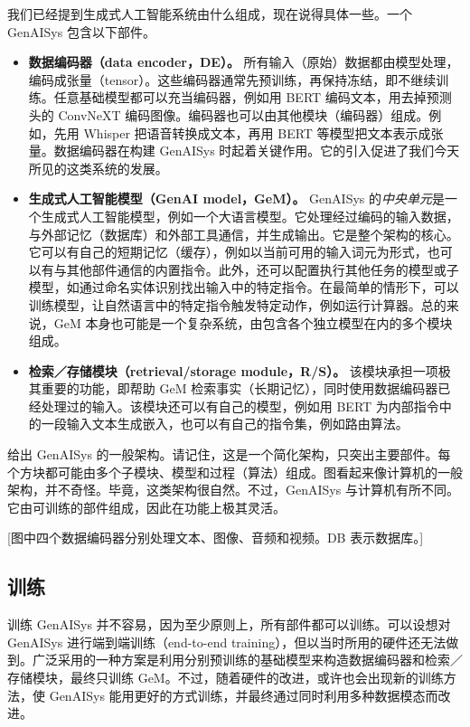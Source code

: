 我们已经提到生成式人工智能系统由什么组成，现在说得具体一些。一个 GenAISys 包含以下部件。
\begin{itemize}
\item \textbf{数据编码器（data encoder，DE）。} 所有输入（原始）数据都由模型处理，编码成张量（tensor）。这些编码器通常先预训练，再保持冻结，即不继续训练。任意基础模型都可以充当编码器，例如用 BERT 编码文本，用去掉预测头的 ConvNeXT 编码图像。编码器也可以由其他模块（编码器）组成。例如，先用 Whisper 把语音转换成文本，再用 BERT 等模型把文本表示成张量。数据编码器在构建 GenAISys 时起着关键作用。它的引入促进了我们今天所见的这类系统的发展。
\item \textbf{生成式人工智能模型（GenAI model，GeM）。} GenAISys 的\emph{中央单元}是一个生成式人工智能模型，例如一个大语言模型。它处理经过编码的输入数据，与外部记忆（数据库）和外部工具通信，并生成输出。它是整个架构的核心。它可以有自己的短期记忆（缓存），例如以当前可用的输入词元为形式，也可以有与其他部件通信的内置指令。此外，还可以配置执行其他任务的模型或子模型，如通过命名实体识别找出输入中的特定指令。在最简单的情形下，可以训练模型，让自然语言中的特定指令触发特定动作，例如运行计算器。总的来说，GeM 本身也可能是一个复杂系统，由包含各个独立模型在内的多个模块组成。
\item \textbf{检索／存储模块（retrieval/storage module，R/S）。} 该模块承担一项极其重要的功能，即帮助 GeM 检索事实（长期记忆），同时使用数据编码器已经处理过的输入。该模块还可以有自己的模型，例如用 BERT 为内部指令中的一段输入文本生成嵌入，也可以有自己的指令集，例如路由算法。
\end{itemize}

给出 GenAISys 的一般架构。请记住，这是一个简化架构，只突出主要部件。每个方块都可能由多个子模块、模型和过程（算法）组成。图看起来像计算机的一般架构，并不奇怪。毕竟，这类架构很自然。不过，GenAISys 与计算机有所不同。它由可训练的部件组成，因此在功能上极其灵活。

[图中四个数据编码器分别处理文本、图像、音频和视频。DB 表示数据库。]

\subsection{训练}
训练 GenAISys 并不容易，因为至少原则上，所有部件都可以训练。可以设想对 GenAISys 进行端到端训练（end-to-end training），但以当时所用的硬件还无法做到。广泛采用的一种方案是利用分别预训练的基础模型来构造数据编码器和检索／存储模块，最终只训练 GeM。不过，随着硬件的改进，或许也会出现新的训练方法，使 GenAISys 能用更好的方式训练，并最终通过同时利用多种数据模态而改进。

